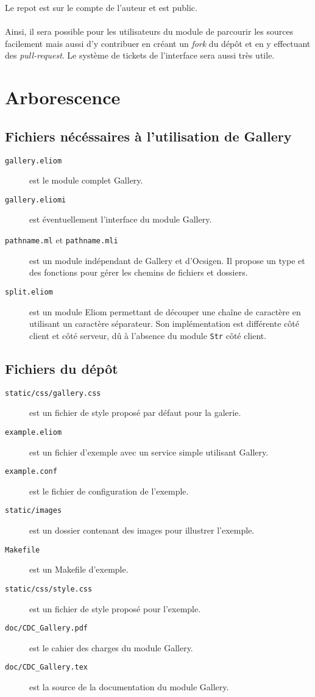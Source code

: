 \documentclass{life-fr}
\begin{document}
Le repot est sur le compte de l'auteur et est public.\\
\\
Ainsi, il sera possible pour les utilisateurs du module de parcourir les
sources facilement mais aussi d'y contribuer en créant un \textit{fork}
du dépôt et en y effectuant des \textit{pull-request}. Le système de
tickets de l'interface sera aussi très utile.

\newpage

\section{Arborescence}

\subsection{Fichiers nécéssaires à l'utilisation de Gallery}

\begin{description}
  \item[\texttt{gallery.eliom}]
    est le module complet Gallery.
  \item[\texttt{gallery.eliomi}]
    est éventuellement l'interface du module Gallery.
  \item[\texttt{pathname.ml} et \texttt{pathname.mli}]
    est un module indépendant de Gallery et d'Ocsigen. Il
    propose un type et des fonctions pour gérer les chemins
    de fichiers et dossiers.
  \item[\texttt{split.eliom}]
    est un module Eliom permettant de découper une chaîne de
    caractère en utilisant un caractère séparateur. Son
    implémentation est différente côté client et côté serveur,
    dû à l'absence du module \texttt{Str} côté client.
\end{description}

\subsection{Fichiers du dépôt}

\begin{description}
  \item[\texttt{static/css/gallery.css}]
    est un fichier de style proposé par défaut pour la galerie.
  \item[\texttt{example.eliom}]
    est un fichier d'exemple avec un service simple utilisant
    Gallery.
  \item[\texttt{example.conf}]
    est le fichier de configuration de l'exemple.
  \item[\texttt{static/images}]
    est un dossier contenant des images pour illustrer
    l'exemple.
  \item[\texttt{Makefile}]
    est un Makefile d'exemple.
  \item[\texttt{static/css/style.css}]
    est un fichier de style proposé pour l'exemple.
  \item[\texttt{doc/CDC\_Gallery.pdf}]
    est le cahier des charges du module Gallery.
  \item[\texttt{doc/CDC\_Gallery.tex}]
    est la source de la documentation du module Gallery.
\end{description}
\end{document}

